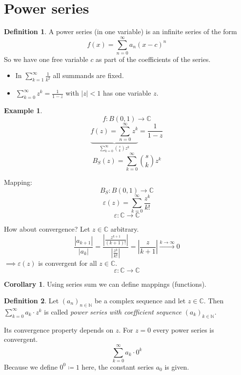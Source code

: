 \documentclass[a4paper,landscape,twocolumn]{article}
\theoremstyle{definition}
\newtheorem{defi}{Definition}
\newtheorem{ex}{Example}
\newtheorem{cor}{Corollary}
\newcommand\abs[1]{\left|#1\right|}
\newcommand\seq[1]{{\left(#1\right)}_{n \in \mathbb N}}
\begin{document}
\section{Power series}
\begin{defi}
  A power series (in one variable) is an infinite series of the form
  \[ f(x) = \sum_{n=0}^\infty a_n (x - c)^n \]
  So we have one free variable $c$ as part of the coefficients of the series.

  \begin{itemize}
    \item In $\sum_{k=1}^\infty \frac{1}{k^2}$ all summands are fixed.
    \item $\sum_{k=0}^\infty z^k = \frac{1}{1 - z}$ with $\abs{z} < 1$
      has one variable $z$.
  \end{itemize}
\end{defi}
\begin{ex}
  \[ f: B(0,1) \to \mathbb C \]
  \[ \underbrace{f(z) = \sum_{n=0}^\infty z^k}_{\sum_{k=0}^\infty {s \choose k} z^k} = \frac{1}{1 - z} \]
  \[ B_S(z) = \sum_{k=0}^\infty {s \choose k} z^k \]

  Mapping:
  \[ B_S: B(0,1) \to \mathbb C \]
  \[ \varepsilon(z) = \sum_{k=0}^\infty \frac{z^k}{k!} \]
  \[ \varepsilon: \mathbb C \to \mathbb C \]

  How about convergence? Let $z \in \mathbb C$ arbitrary.
  \[
    \frac{\abs{a_{k+1}}}{\abs{a_k}}
    = \frac{\abs{\frac{z^{k+1}}{(k+1)!}}}{\abs{\frac{z^k}{k!}}}
    = \abs{\frac{z}{k+1}}
    \xrightarrow{k \to \infty} 0
  \]
  $\implies \varepsilon(z)$ is convergent for all $z \in \mathbb C$.
  \[ \varepsilon: \mathbb C \to \mathbb C \]
\end{ex}
\begin{cor}
  Using series sum we can define mappings (functions).
\end{cor}
\begin{defi}
  Let $\seq{a_n}$ be a complex sequence and let $z \in \mathbb C$.
  Then $\sum_{k=0}^\infty a_k \cdot z^k$ is called \emph{power series with
  coefficient sequence $\left(a_k\right)_{k \in \mathbb N}$}.

  Its convergence property depends on $z$.
  For $z = 0$ every power series is convergent.
  \[ \sum_{k=0}^\infty a_k \cdot 0^k \]
  Because we define $0^0 \coloneqq 1$ here, the constant series $a_0$ is given.
\end{defi}
\end{document}
